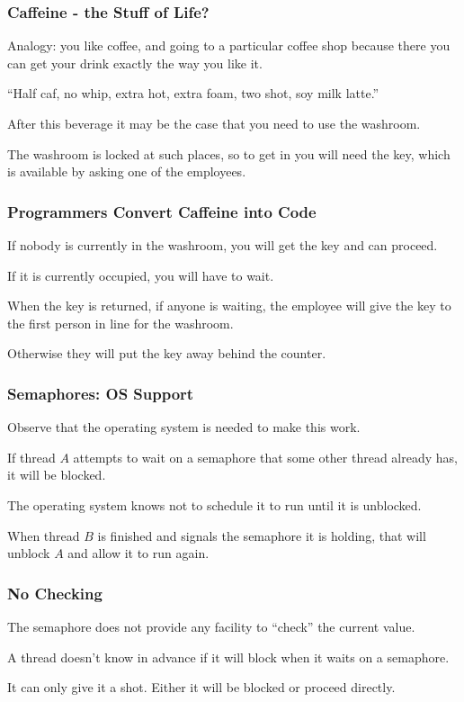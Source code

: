 \begin{frame}
\frametitle{Caffeine - the Stuff of Life?}

Analogy: you like coffee, and going to a particular coffee shop because there you can get your drink exactly the way you like it.

``Half caf, no whip, extra hot, extra foam, two shot, soy milk latte.''

After this beverage it may be the case that you need to use the washroom. 

The washroom is locked at such places, so to get in you will need the key, which is available by asking one of the employees. 

\end{frame}

\begin{frame}
\frametitle{Programmers Convert Caffeine into Code}

If nobody is currently in the washroom, you will get the key and can proceed. 

If it is currently occupied, you will have to wait. 

When the key is returned, if anyone is waiting, the employee will give the key to the first person in line for the washroom. 

Otherwise they will put the key away behind the counter.


\end{frame}

\begin{frame}
\frametitle{Semaphores: OS Support}

Observe that the operating system is needed to make this work. 

If thread $A$ attempts to wait on a semaphore that some other thread already has, it will be blocked. 

The operating system knows not to schedule it to run until it is unblocked. 

When thread $B$ is finished and signals the semaphore it is holding, that will unblock $A$ and allow it to run again.


\end{frame}

\begin{frame}
\frametitle{No Checking}


The semaphore does not provide any facility to ``check'' the current value. 

A thread doesn't know in advance if it will block when it waits on a semaphore.

It can only give it a shot. Either it will be blocked or proceed directly.

\end{frame}

